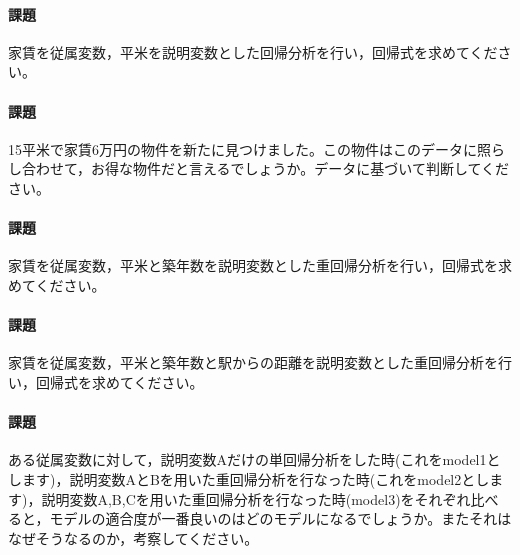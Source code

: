 \documentclass{ltjbook}
\begin{document}
\paragraph{課題}家賃を従属変数，平米を説明変数とした回帰分析を行い，回帰式を求めてください。
\paragraph{課題}15平米で家賃6万円の物件を新たに見つけました。この物件はこのデータに照らし合わせて，お得な物件だと言えるでしょうか。データに基づいて判断してください。
\paragraph{課題}家賃を従属変数，平米と築年数を説明変数とした重回帰分析を行い，回帰式を求めてください。
\paragraph{課題}家賃を従属変数，平米と築年数と駅からの距離を説明変数とした重回帰分析を行い，回帰式を求めてください。
\paragraph{課題}ある従属変数に対して，説明変数Aだけの単回帰分析をした時(これをmodel1とします)，説明変数AとBを用いた重回帰分析を行なった時(これをmodel2とします)，説明変数A,B,Cを用いた重回帰分析を行なった時(model3)をそれぞれ比べると，モデルの適合度が一番良いのはどのモデルになるでしょうか。またそれはなぜそうなるのか，考察してください。
\end{document}

